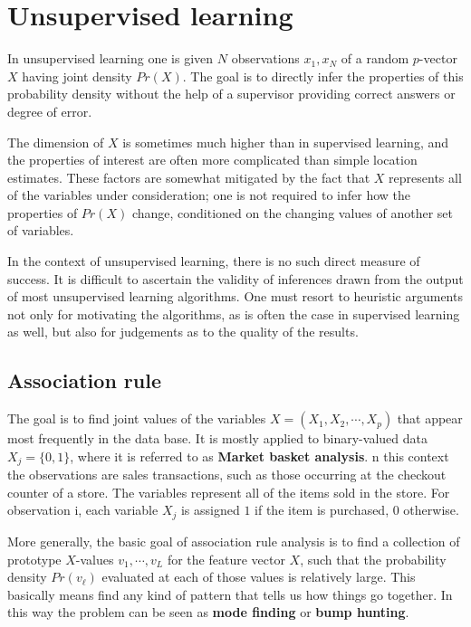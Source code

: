 \documentclass[12pt, letterpaper]{article}
\theoremstyle{definition}
\begin{document}
\newpage
\section{Unsupervised learning}
In unsupervised learning one is given $N$ observations $x_1, x_N$ of a random $p$-vector $X$ having joint density $Pr(X)$. The goal is to directly infer the properties of this probability density without the help of a supervisor providing correct answers or degree of error. 

The dimension of $X$ is sometimes much higher than in supervised learning, and the properties of interest are often more complicated than simple location estimates. These factors are somewhat mitigated by the fact that $X$ represents all of the variables under consideration; one is not required to infer how the properties of $Pr(X)$ change, conditioned on the changing values of another set of variables.

In the context of unsupervised learning, there is no such direct measure of success. It is difficult to ascertain the validity of inferences drawn from the output of most unsupervised learning algorithms. One must resort to heuristic arguments not only for motivating the algorithms, as is often the case in supervised learning as well, but also for judgements as to the quality of the results. 

\subsection{Association rule}
The goal is to find joint values of the variables $X = (X_1, X_2, \cdots , X_p)$ that appear most frequently in the data base. It is mostly applied to binary-valued data $X_j = \{0,1\}$, where it is referred to as \textbf{Market basket analysis}. n this context the observations are sales transactions, such as those occurring at the checkout counter of a store. The variables represent all of the items sold in the store. For observation i, each variable $X_j$ is assigned $1$ if the item is purchased, $0$ otherwise.

More generally, the basic goal of association rule analysis is to find a collection of prototype $X$-values $v_1,\cdots,v_L$ for the feature vector $X$, such that the probability density $Pr(v_\ell)$ evaluated at each of those values is relatively large. This basically means find any kind of pattern that tells us how things go together. In this way the problem can be seen as \textbf{mode finding} or \textbf{bump hunting}.
\end{document}
